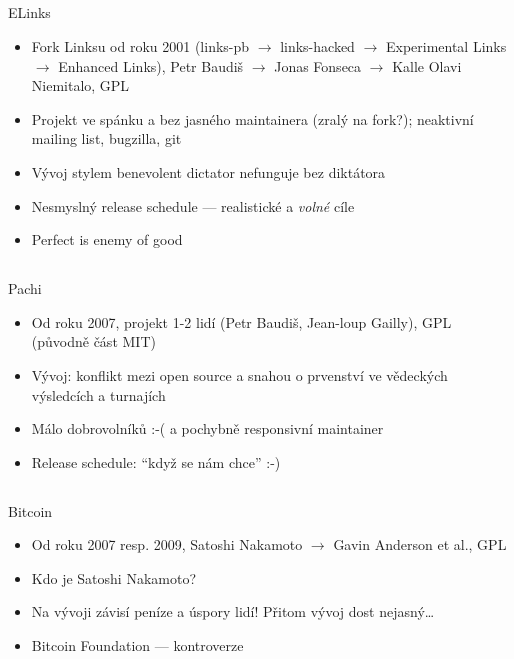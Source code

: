 \documentclass{beamer}
\begin{document}
\subsection{}
\begin{frame}{ELinks}
\begin{itemize}
\item Fork Linksu od roku 2001 (links-pb $\to$ links-hacked $\to$ Experimental Links $\to$ Enhanced Links), Petr Baudiš $\to$ Jonas Fonseca $\to$ Kalle Olavi Niemitalo, GPL
\item Projekt ve spánku a bez jasného maintainera (zralý na fork?); neaktivní mailing list, bugzilla, git
\item Vývoj stylem benevolent dictator nefunguje bez diktátora
\item Nesmyslný release schedule --- realistické a {\em volné} cíle
\item Perfect is enemy of good
\end{itemize}
\end{frame}

\subsection{}
\begin{frame}{Pachi}
\begin{itemize}
\item Od roku 2007, projekt 1-2 lidí (Petr Baudiš, Jean-loup Gailly), GPL (původně část MIT)
\item Vývoj: konflikt mezi open source a snahou o prvenství ve vědeckých výsledcích a turnajích
\item Málo dobrovolníků :-( a pochybně responsivní maintainer
\item Release schedule: ``když se nám chce'' :-)
\end{itemize}
\end{frame}

\subsection{}
\begin{frame}{Bitcoin}
\begin{itemize}
\item Od roku 2007 resp. 2009, Satoshi Nakamoto $\to$ Gavin Anderson et al., GPL
\item Kdo je Satoshi Nakamoto?
\item Na vývoji závisí peníze a úspory lidí! Přitom vývoj dost nejasný\dots
\item Bitcoin Foundation --- kontroverze
\end{itemize}
\end{frame}
\end{document}
